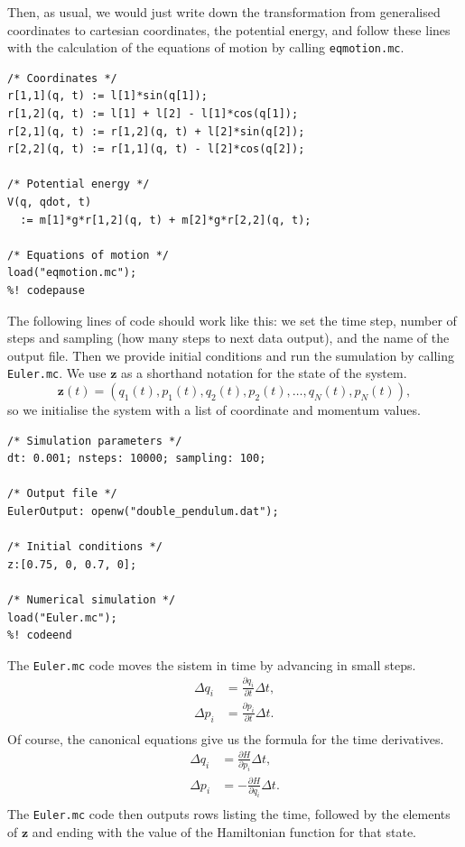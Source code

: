\documentclass{article}
\begin{document}
Then, as usual, we would just write down the transformation from generalised
coordinates to cartesian coordinates, the potential energy, and follow these
lines with the calculation of the equations of motion by calling
\texttt{eqmotion.mc}.
\begin{lstlisting}[frame=single]
%! codecontinue: double_pendulum.mc
/* Coordinates */
r[1,1](q, t) := l[1]*sin(q[1]);
r[1,2](q, t) := l[1] + l[2] - l[1]*cos(q[1]);
r[2,1](q, t) := r[1,2](q, t) + l[2]*sin(q[2]);
r[2,2](q, t) := r[1,1](q, t) - l[2]*cos(q[2]);

/* Potential energy */
V(q, qdot, t)
  := m[1]*g*r[1,2](q, t) + m[2]*g*r[2,2](q, t);

/* Equations of motion */
load("eqmotion.mc");
%! codepause
\end{lstlisting}
The following lines of code should work like this: we set the time step, number
of steps and sampling (how many steps to next data output), and the name of the
output file. Then we provide initial conditions and run the sumulation by
calling \texttt{Euler.mc}. We use $\mathbf{z}$ as a shorthand notation for the
state of the system.
\begin{equation}
  \mathbf{z}(t) = (q_1(t), p_1(t), q_2(t), p_2(t), \ldots, q_N(t), p_N(t)),
\end{equation}
so we initialise the system with a list of coordinate and momentum values.
\begin{lstlisting}[frame=single]
%! codecontinue: double_pendulum.mc
/* Simulation parameters */
dt: 0.001; nsteps: 10000; sampling: 100;

/* Output file */
EulerOutput: openw("double_pendulum.dat");

/* Initial conditions */
z:[0.75, 0, 0.7, 0];

/* Numerical simulation */
load("Euler.mc");
%! codeend
\end{lstlisting}
The \texttt{Euler.mc} code moves the sistem in time by advancing in small steps.
\begin{align}
  \Delta q_i & = \frac{\partial q_i}{\partial t} \Delta t, \\
  \Delta p_i & = \frac{\partial p_i}{\partial t} \Delta t. \\
\end{align}
Of course, the canonical equations give us the formula for the time derivatives.
\begin{align}
  \Delta q_i & = \frac{\partial H}{\partial p_i} \Delta t, \\
  \Delta p_i & = -\frac{\partial H}{\partial q_i} \Delta t. \\
\end{align}
The \texttt{Euler.mc} code then outputs rows listing the time, followed by the
elements of $\mathbf{z}$ and ending with the value of the Hamiltonian function
for that state.
\end{document}
